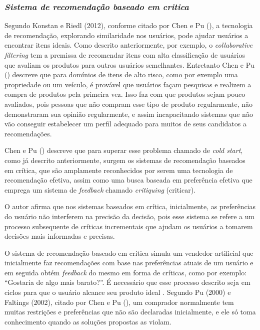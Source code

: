 \subsubsection{\textit{Sistema de recomendação baseado em critica}}
\label{Critiquing-based}
Segundo Konstan e Riedl (2012), conforme citado por Chen e Pu (\citeyear{Chen:2012}), a tecnologia de recomendação, explorando similaridade nos usuários, pode ajudar usuários a encontrar itens ideais. Como descrito anteriormente, por exemplo, o \textit{collaborative filtering} tem a premissa de recomendar itens com alta classificação de usuários que avaliam os produtos para outros usuários semelhantes. Entretanto Chen e Pu (\citeyear{Chen:2012}) descreve que para domínios de itens de alto risco, como por exemplo uma propriedade ou um veículo, é provável que usuários façam pesquisas e realizem a compra de produtos pela primeira vez. Isso faz com que produtos sejam pouco avaliados, pois pessoas que não compram esse tipo de produto regularmente, não demonstraram sua opinião regularmente, e assim incapacitando sistemas que não vão conseguir estabelecer um perfil adequado para muitos de seus candidatos a recomendações.

Chen e Pu (\citeyear{Chen:2012}) descreve que para superar esse problema chamado de \textit{cold start}, como já descrito anteriormente, surgem os sistemas de recomendação baseados em crítica, que são amplamente reconhecidos por serem uma tecnologia de recomendação efetiva, assim como uma busca baseada em preferência efetiva que emprega um sistema de \textit{feedback} chamado \textit{critiquing} (criticar).

O autor afirma que nos sistemas baseados em crítica, inicialmente, as preferências do usuário não interferem na precisão da decisão, pois esse sistema se refere a um processo subsequente de críticas incrementais que ajudam os usuários a tomarem decisões mais informadas e precisas.

O sistema de recomendação baseado em crítica simula um vendedor artificial que inicialmente faz recomendações com base nas preferências atuais de um usuário e em seguida obtém \textit{feedback} do mesmo em forma de críticas, como por exemplo: “Gostaria de algo mais barato?”. É necessário que esse processo descrito seja em ciclos para que o usuário alcance seu produto ideal \cite{Chen:2012}. Segundo Pu (2000) e Faltings (2002), citado por Chen e Pu (\citeyear{Chen:2012}), um comprador normalmente tem muitas restrições e preferências que não são declaradas inicialmente, e ele só toma conhecimento quando as soluções propostas as violam.

